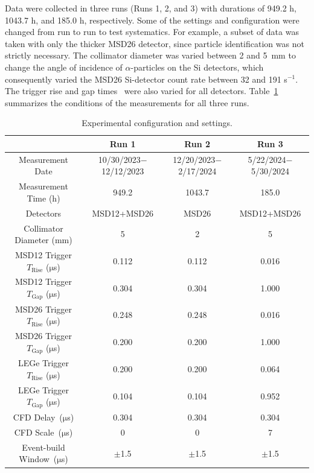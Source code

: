 \documentclass[aps,UTF8,prc,twocolumn,preprintnumbers,amsmath,amssymb,floatfix]{revtex4-2}
\begin{document}
Data were collected in three runs (Runs 1, 2, and 3) with durations of 949.2 h, 1043.7 h, and 185.0 h, respectively. Some of the settings and configuration were changed from run to run to test systematics. For example, a subset of data was taken with only the thicker MSD26 detector, since particle identification was not strictly necessary. The collimator diameter was varied between 2 and 5~mm to change the angle of incidence of $\alpha$-particles on the Si detectors, which consequently varied the MSD26 Si-detector count rate between 32 and 191 s$^{-1}$. The trigger rise and gap times~\cite{Sun_PRC2025} were also varied for all detectors. Table~\ref{Settings} summarizes the conditions of the measurements for all three runs.

\begin{table}[htbp!]
\caption{\label{Settings} Experimental configuration and settings.}
\begin{center}
\renewcommand{\arraystretch}{1.1}  %
\begin{ruledtabular}
\begin{tabular}{cccc}
   & Run 1  & Run 2  & Run 3\\
\hline
Measurement Date & 10/30/2023$-$12/12/2023 & 12/20/2023$-$2/17/2024 & 5/22/2024$-$5/30/2024 \\
Measurement Time (h) & 949.2 & 1043.7 & 185.0 \\
Detectors & MSD12+MSD26 & MSD26 & MSD12+MSD26 \\
Collimator Diameter (mm) & 5 & 2 & 5 \\
MSD12 Trigger $T_{\mathrm{Rise}}$ ($\mathrm{\mu}$s) & 0.112 & 0.112 & 0.016 \\
MSD12 Trigger $T_{\mathrm{Gap}}$ ($\mathrm{\mu}$s) & 0.304 & 0.304 & 1.000 \\
MSD26 Trigger $T_{\mathrm{Rise}}$ ($\mathrm{\mu}$s) & 0.248 & 0.248 & 0.016 \\
MSD26 Trigger $T_{\mathrm{Gap}}$ ($\mathrm{\mu}$s) & 0.200 & 0.200 & 1.000 \\
LEGe Trigger $T_{\mathrm{Rise}}$ ($\mathrm{\mu}$s) & 0.200 & 0.200 & 0.064 \\
LEGe Trigger $T_{\mathrm{Gap}}$ ($\mathrm{\mu}$s) & 0.104 & 0.104 & 0.952 \\
CFD Delay~($\mathrm{\mu}$s) & 0.304 & 0.304 & 0.304 \\
CFD Scale~($\mathrm{\mu}$s) & 0 & 0 & 7 \\
Event-build Window~($\mathrm{\mu}$s) & $\pm$1.5 & $\pm$1.5 & $\pm$1.5 \\

\end{tabular}
\end{ruledtabular}
\end{center}
\end{table}
\end{document}
